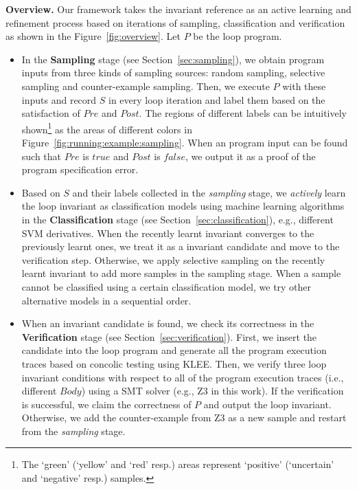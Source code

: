 \medskip\noindent
\textbf{Overview.}
Our framework takes the invariant reference as an active learning and refinement process 
based on iterations of sampling, classification and verification 
as shown in the Figure~\ref{fig:overview}. 
Let $P$ be the loop program. 
\begin{itemize}
    \item 
    In the \textbf{Sampling} stage (see Section~\ref{sec:sampling}), 
    we obtain program inputs from three kinds of sampling sources: 
    random sampling, selective sampling and counter-example sampling. 
    Then, we execute $P$ with these inputs and record $S$ in every loop iteration 
    and label them based on the satisfaction of $\mathit{Pre}$ and $\mathit{Post}$. 
    The regions of different labels can be intuitively shown\footnote{
        The `green' (`yellow' and `red' resp.) areas 
        represent `positive' (`uncertain' and `negative' resp.) samples. 
    } as the areas of different colors in Figure~\ref{fig:running:example:sampling}. 
    When an program input can be found such that 
    $\mathit{Pre}$ is $\mathit{true}$ and $\mathit{Post}$ is $\mathit{false}$, 
    we output it as a proof of the program specification error. 
    \item 
    Based on $S$ and their labels collected in the \emph{sampling} stage, 
    we \emph{actively} learn the loop invariant as classification models 
    using machine learning algorithms 
    in the \textbf{Classification} stage (see Section~\ref{sec:classification}), 
    e.g., different SVM derivatives. 
    When the recently learnt invariant converges to the previously learnt ones, 
    we treat it as a invariant candidate and move to the verification step. 
    Otherwise, we apply selective sampling on the recently learnt invariant 
    to add more samples in the sampling stage. 
    When a sample cannot be classified using a certain classification model, 
    we try other alternative models in a sequential order. 
    \item 
    When an invariant candidate is found, 
    we check its correctness in the \textbf{Verification} stage (see Section~\ref{sec:verification}). 
    First, we insert the candidate into the loop program and generate all the program execution traces 
    based on concolic testing using KLEE\cite{cadar2008klee}. 
    Then, we verify three loop invariant conditions 
    with respect to all of the program execution traces (i.e., different $\mathit{Body}$) 
    using a SMT\cite{barrett2009satisfiability} solver (e.g., Z3\cite{de2008z3} in this work). 
    If the verification is successful, we claim the correctness of $P$ and output the loop invariant. 
    Otherwise, we add the counter-example from Z3 as a new sample 
    and restart from the \emph{sampling} stage. 
\end{itemize}

